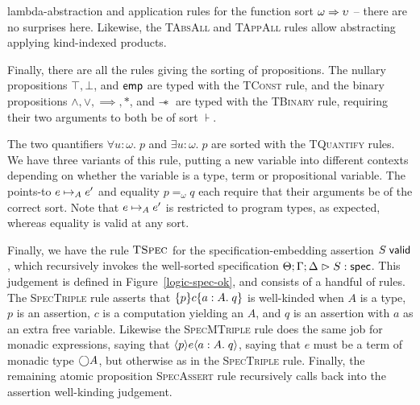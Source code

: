 % 
lambda-abstraction and application rules for the function sort $\omega
\Rightarrow \upsilon$ -- there are no surprises here. Likewise, the
\textsc{TAbsAll} and \textsc{TAppAll} rules allow abstracting
applying kind-indexed products.

Finally, there are all
the rules giving the sorting of propositions. The nullary propositions
$\top, \bot$, and $\mathsf{emp}$ are typed with the \textsc{TConst}
rule, and the binary propositions $\land, \vee, \implies, *$, and
$-\!\!*\,$ are typed with the \textsc{TBinary} rule, requiring
their two arguments to both be of sort $\assert$.


The two quantifiers $\forall u:\omega.\;p$ and $\exists u:\omega.\;p$
are sorted with the \textsc{TQuantify} rules. We have three
variants of this rule, putting a new variable into different contexts
depending on whether the variable is a type, term or propositional
variable.  The points-to $e \mapsto_A e'$ and equality $p =_\omega
q$ each require that their arguments be of the correct sort. Note that
$e \mapsto_A e'$ is restricted to program types, as expected,
whereas equality is valid at any sort.

Finally, we have the rule $\textsc{TSpec}$ for the
specification-embedding assertion ${S}\;\mathsf{valid}$, which recursively
invokes the well-sorted specification ${\Theta; \Gamma; \Delta} \vartriangleright {S} : \mathsf{spec}$. This judgement is
defined in Figure~\ref{logic-spec-ok}, and consists of a handful of
rules. The \textsc{SpecTriple} rule asserts that $\{{p}\}{c}\{{a:A}.\;{q}\}$
is well-kinded when $A$ is a type, $p$ is an assertion, $c$ is a
computation yielding an $A$, and $q$ is an assertion with $a$ as an
extra free variable.  Likewise the \textsc{SpecMTriple} rule does the
same job for monadic expressions, saying that $\langle{p}\rangle{e}\langle{a:A}.\;{q}\rangle$,
saying that $e$ must be a term of monadic type $\bigcirc{A}$, but
otherwise as in the \textsc{SpecTriple} rule.  Finally, the remaining
atomic proposition \textsc{SpecAssert} rule recursively calls back into the
assertion well-kinding judgement.

